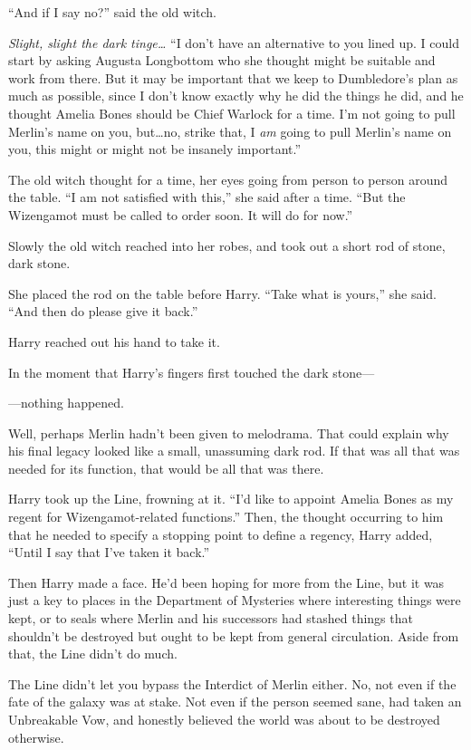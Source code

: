 “And if I say no?” said the old witch.

\emph{Slight, slight the dark tinge…} “I don’t have an alternative to you lined up. I could start by asking Augusta Longbottom who she thought might be suitable and work from there. But it may be important that we keep to Dumbledore’s plan as much as possible, since I don’t know exactly why he did the things he did, and he thought Amelia Bones should be Chief Warlock for a time. I’m not going to pull Merlin’s name on you, but…no, strike that, I \emph{am} going to pull Merlin’s name on you, this might or might not be insanely important.”

The old witch thought for a time, her eyes going from person to person around the table. “I am not satisfied with this,” she said after a time. “But the Wizengamot must be called to order soon. It will do for now.”

Slowly the old witch reached into her robes, and took out a short rod of stone, dark stone.

She placed the rod on the table before Harry. “Take what is yours,” she said. “And then do please give it back.”

Harry reached out his hand to take it.

In the moment that Harry’s fingers first touched the dark stone—

—nothing happened.

Well, perhaps Merlin hadn’t been given to melodrama. That could explain why his final legacy looked like a small, unassuming dark rod. If that was all that was needed for its function, that would be all that was there.

Harry took up the Line, frowning at it. “I’d like to appoint Amelia Bones as my regent for Wizengamot-related functions.” Then, the thought occurring to him that he needed to specify a stopping point to define a regency, Harry added, “Until I say that I’ve taken it back.”

Then Harry made a face. He’d been hoping for more from the Line, but it was just a key to places in the Department of Mysteries where interesting things were kept, or to seals where Merlin and his successors had stashed things that shouldn’t be destroyed but ought to be kept from general circulation. Aside from that, the Line didn’t do much.

The Line didn’t let you bypass the Interdict of Merlin either. No, not even if the fate of the galaxy was at stake. Not even if the person seemed sane, had taken an Unbreakable Vow, and honestly believed the world was about to be destroyed otherwise.

